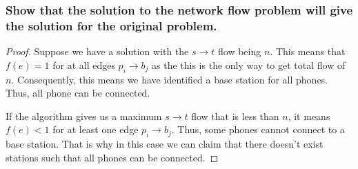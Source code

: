 \documentclass[11pt]{scrartcl}
\begin{document}
\subsubsection{
	Show that the solution to the network flow problem will give the solution for
	the original problem.
}


\begin{proof}
	Suppose we have a solution with the $s \rightarrow t$ flow being $n$.
	This means that $f(e) = 1$ for at all edges $p_i \rightarrow b_j$ as the this is the only
	way to get total flow of $n$. Consequently, this means we have identified
	a base station for all phones.  Thus, all phone can be connected.

	If the algorithm gives us a maximum $s \rightarrow t$ flow that is less than $n$,
	it means $f(e) < 1$ for at least one edge $p_i \rightarrow b_j$.
	Thus, some phones cannot connect to a base station.
	That is why in this case we can claim that there doesn't exist stations such that
	all phones can be connected.
\end{proof}
\end{document}

